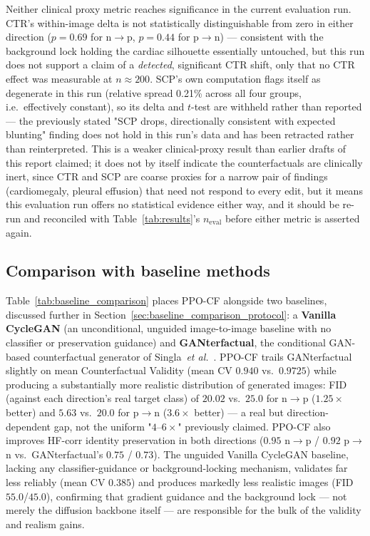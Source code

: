 \documentclass[11pt]{article}
\newcommand{\method}{\textsc{PPO-CF}}
\begin{document}
Neither clinical proxy metric reaches significance in the current
evaluation run. CTR's within-image delta is not statistically
distinguishable from zero in either direction ($p=0.69$ for n$\to$p,
$p=0.44$ for p$\to$n) — consistent with the background lock holding the
cardiac silhouette essentially untouched, but this run does not support a
claim of a \emph{detected}, significant CTR shift, only that no CTR effect
was measurable at $n\!\approx\!200$. SCP's own computation flags itself as
degenerate in this run (relative spread 0.21\% across all four groups,
i.e.\ effectively constant), so its delta and $t$-test are withheld rather
than reported — the previously stated "SCP drops, directionally
consistent with expected blunting" finding does not hold in this run's
data and has been retracted rather than reinterpreted. This is a weaker
clinical-proxy result than earlier drafts of this report claimed; it does
not by itself indicate the counterfactuals are clinically inert, since CTR
and SCP are coarse proxies for a narrow pair of findings (cardiomegaly,
pleural effusion) that need not respond to every edit, but it means this
evaluation run offers no statistical evidence either way, and it should
be re-run and reconciled with Table~\ref{tab:results}'s $n_{\text{eval}}$
before either metric is asserted again.

\subsection{Comparison with baseline methods}
\label{sec:baseline_comparison}

Table~\ref{tab:baseline_comparison} places \method{} alongside two
baselines, discussed further in Section~\ref{sec:baseline_comparison_protocol}:
a \textbf{Vanilla
CycleGAN} (an unconditional, unguided image-to-image baseline with no
classifier or preservation guidance) and \textbf{GANterfactual}, the
conditional GAN-based counterfactual generator of
Singla~\emph{et al.}~\cite{singla2022}. \method{} trails GANterfactual
slightly on mean Counterfactual Validity (mean CV $0.940$ vs.\ $0.9725$)
while producing a substantially more realistic distribution of generated
images: FID (against each direction's real target class) of $20.02$
vs.\ $25.0$ for n$\to$p ($1.25\times$ better) and $5.63$ vs.\ $20.0$ for
p$\to$n ($3.6\times$ better) — a real but direction-dependent gap, not the
uniform "$4$--$6\times$" previously claimed. \method{} also improves
HF-corr identity preservation in both directions ($0.95$ n$\to$p / $0.92$
p$\to$n vs.\ GANterfactual's $0.75$ / $0.73$). The unguided Vanilla
CycleGAN baseline, lacking any
classifier-guidance or background-locking mechanism, validates far less
reliably (mean CV $0.385$) and produces markedly less realistic images
(FID $55.0$/$45.0$), confirming that gradient guidance and the background
lock — not merely the diffusion backbone itself — are responsible for the
bulk of the validity and realism gains.
\end{document}
